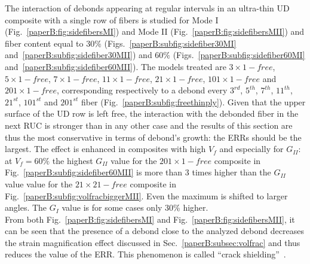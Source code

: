 The interaction of debonds appearing at regular intervals in an ultra-thin UD composite with a single row of fibers is studied for Mode I (Fig.~\ref{paperB:fig:sidefibersMI}) and Mode II (Fig.~\ref{paperB:fig:sidefibersMII}) and fiber content equal to $30\%$ (Figs.~\ref{paperB:subfig:sidefiber30MI} and~\ref{paperB:subfig:sidefiber30MII}) and $60\%$ (Figs.~\ref{paperB:subfig:sidefiber60MI} and~\ref{paperB:subfig:sidefiber60MII}). The models treated are $3\times 1-free$, $5\times 1-free$, $7\times 1-free$, $11\times 1-free$, $21\times 1-free$, $101\times 1-free$ and $201\times 1-free$, corresponding respectively to a debond every $3^{rd}$, $5^{th}$, $7^{th}$, $11^{th}$, $21^{st}$, $101^{st}$ and $201^{st}$ fiber (Fig.~\ref{paperB:subfig:freethinply}). Given that the upper surface of the UD row is left free, the interaction with the debonded fiber in the next RUC is stronger than in any other case and the results of this section are thus the most conservative in terms of debond's growth: the ERRs should be the largest. The effect is enhanced in composites with high $V_{f}$ and especially for $G_{II}$: at $V_{f}=60\%$ the highest $G_{II}$ value for the $201\times 1-free$ composite in Fig.~\ref{paperB:subfig:sidefiber60MII} is more than $3$ times higher than the $G_{II}$ value value for the $21\times21-free$ composite in Fig.~\ref{paperB:subfig:volfracbiggerMII}. Even the maximum is shifted to larger angles. The $G_{I}$ value is for some cases only 30\% higher.\\
From both Fig.~\ref{paperB:fig:sidefibersMI} and Fig.~\ref{paperB:fig:sidefibersMII}, it can be seen that the presence of a debond close to the analyzed debond decreases the strain magnification effect discussed in Sec.~\ref{paperB:subsec:volfrac} and thus reduces the value of the ERR. This phenomenon is called ``crack shielding''~\cite{Garcia2015}.

